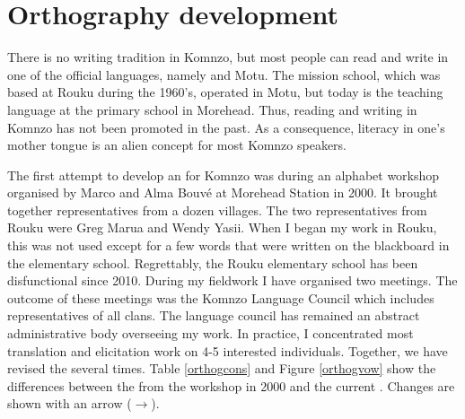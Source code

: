 \section{Orthography development}\label{orthographydev}

There is no writing tradition in Komnzo, but most people can read and write in one of the official languages, namely  and Motu. The mission school, which was based at Rouku during the 1960's, operated in Motu, but today  is the teaching language at the primary school in Morehead. Thus, reading and writing in Komnzo has not been promoted in the past. As a consequence, literacy in one's mother tongue is an alien concept for most Komnzo speakers.%

The first attempt to develop an  for Komnzo was during an alphabet workshop organised by Marco and Alma Bouvé at Morehead Station in 2000. It brought together representatives from a dozen villages. The two representatives from Rouku were Greg Marua and Wendy Yasii. When I began my work in Rouku, this  was not used except for a few words that were written on the blackboard in the elementary school. Regrettably, the Rouku elementary school has been disfunctional since 2010. During my fieldwork I have organised two  meetings. The outcome of these meetings was the Komnzo Language Council which includes representatives of all clans. The language council has remained an abstract administrative body overseeing my work. In practice, I concentrated most translation and elicitation work on 4-5 interested individuals. Together, we have revised the  several times. Table \ref{orthogcons} and Figure \ref{orthogvow} show the differences between the  from the workshop in 2000 and the current . Changes are shown with an arrow ($\rightarrow$).

